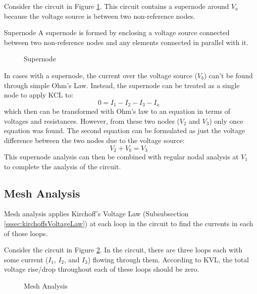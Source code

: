 \documentclass[12pt]{article}
\begin{document}
Consider the circuit in Figure \ref{fig:031}. This circuit contains a {\color{ma} supernode} around $V_a$ because the voltage source is between two non-reference nodes.

\begin{definition}{Supernode}
  A supernode is formed by enclosing a voltage source connected between two non-reference nodes and any elements connected in parallel with it.
\end{definition}

\begin{figure}[H]
  \centering
  
  \caption{Supernode}
  \label{fig:031}
\end{figure}

In cases with a supernode, the current over the voltage source ($V_b$) can't be found through simple Ohm's Law. Instead, the supernode can be treated as a single node to apply KCL to:
\begin{equation*}
  0 = I_1 - I_2 - I_3 - I_a
\end{equation*}
which then can be transformed with Ohm's law to an equation in terms of voltages and resistances. However, from these two nodes ($V_2$ and $V_3$) only once equation was found. The second equation can be formulated as just the voltage difference between the two nodes due to the voltage source:
\begin{equation*}
  V_2 + V_b = V_3
\end{equation*}
This supernode analysis can then be combined with regular nodal analysis at $V_1$ to complete the analysis of the circuit.

\subsection{Mesh Analysis}
\label{ssec:meshAnalysis}

Mesh analysis applies Kirchoff's Voltage Law (Subsubsection \ref{sssec:kirchoffsVoltageLaw}) at each loop in the circuit to find the currents in each of those loops.

Consider the circuit in Figure \ref{fig:032}. In the circuit, there are three loops each with some current ($I_1$, $I_2$, and $I_3$) flowing through them. According to KVL, the total voltage rise/drop throughout each of these loops should be zero.

\begin{figure}[H]
  \centering
  
  \caption{Mesh Analysis}
  \label{fig:032}
\end{figure}
\end{document}
